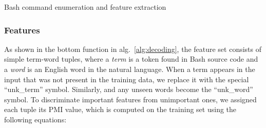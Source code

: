 \begin{algorithm} [ht]
\caption{Bash command enumeration and feature extraction\label{alg:decoding}}

\end{algorithm}

\subsubsection{Features}
\label{subsec:feature}
As shown in the bottom function in alg.~\ref{alg:decoding}, the feature set consists of simple term-word tuples, where a \emph{term} is a token found in Bash source code and a \emph{word} is an English word in the natural language. When a term appears in the input that was not present in the training data, we replace it with the special ``unk\_term'' symbol. Similarly, and any unseen words become the ``unk\_word'' symbol. To discriminate important features from unimportant ones, we assigned each tuple its PMI value, which is computed on the training set using the following equations:


